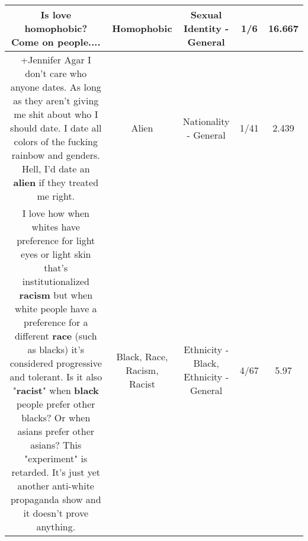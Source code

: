 \documentclass[11pt]{article}
\newlength\mylength
\begin{document}
\begin{center}
\begin{longtable}{|C{.65\mylength}|C{.30\mylength}|C{.12\mylength}|C{.12\mylength}|C{.12\mylength}|}
  \small Is love \textbf{homophobic}? Come on people....\normalsize   & Homophobic & Sexual Identity - General & 1/6 & 16.667 \\  \hline
  \small +Jennifer Agar I don't care who anyone dates. As long as they aren't giving me shit about who I should date. I date all colors of the fucking rainbow and genders. Hell, I'd date an \textbf{alien} if they treated me right.\normalsize   & Alien & Nationality - General & 1/41 & 2.439 \\  \hline
  \small I love how when whites have preference for light eyes or light skin that's institutionalized \textbf{racism} but when white people have a preference for a different \textbf{race} (such as blacks) it's considered progressive and tolerant. Is it also "\textbf{racist}" when \textbf{black} people prefer other blacks? Or when asians prefer other asians? This "experiment" is retarded. It's just yet another anti-white propaganda show and it doesn't prove anything.\normalsize   & Black, Race, Racism, Racist & Ethnicity - Black, Ethnicity - General & 4/67 & 5.97 \\  \hline

\end{longtable}
\end{center}
\end{document}
